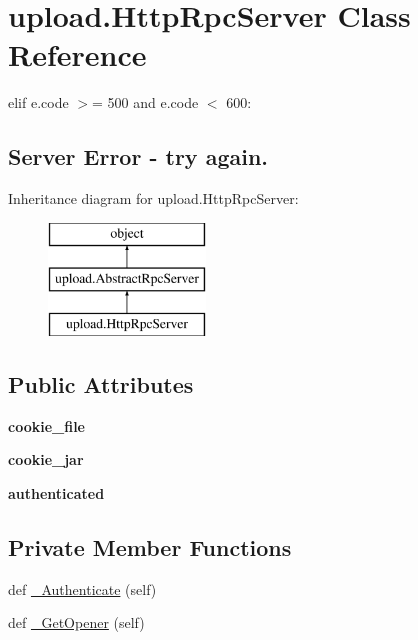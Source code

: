 \hypertarget{classupload_1_1_http_rpc_server}{}\section{upload.\+Http\+Rpc\+Server Class Reference}
\label{classupload_1_1_http_rpc_server}


elif e.\+code $>$= 500 and e.\+code $<$ 600\+: \subsection*{Server Error -\/ try again.} 


Inheritance diagram for upload.\+Http\+Rpc\+Server\+:\begin{figure}[H]
\begin{center}
\leavevmode
\includegraphics[height=3.000000cm]{classupload_1_1_http_rpc_server}
\end{center}
\end{figure}
\subsection*{Public Attributes}
\begin{DoxyCompactItemize}
\item 
\mbox{\label{classupload_1_1_http_rpc_server_ad5c1a730c030f9d3b5f70c2e0d8b9a1d}} 
{\bfseries cookie\+\_\+file}
\item 
\mbox{\label{classupload_1_1_http_rpc_server_a1b9c9af7f0a46afd84a9d524782323bf}} 
{\bfseries cookie\+\_\+jar}
\item 
\mbox{\label{classupload_1_1_http_rpc_server_aaa356e2491537dd0d4bfc5b1bb0fec96}} 
{\bfseries authenticated}
\end{DoxyCompactItemize}
\subsection*{Private Member Functions}
\begin{DoxyCompactItemize}
\item 
def \mbox{\hyperlink{classupload_1_1_http_rpc_server_ab46a30c5aaa9f4d8f5a4bcb32293010e}{\+\_\+\+Authenticate}} (self)
\item 
def \mbox{\hyperlink{classupload_1_1_http_rpc_server_a4685030df704ec17f020c8790108a05a}{\+\_\+\+Get\+Opener}} (self)
\end{DoxyCompactItemize}
